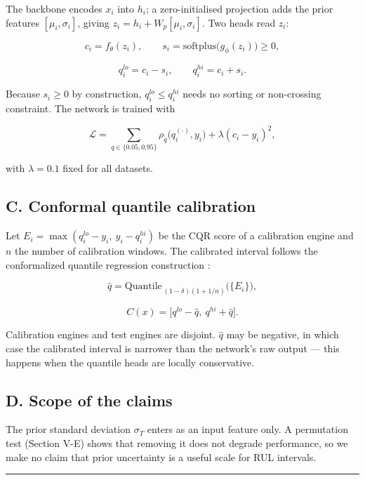 The backbone encodes \(x_i\) into \(h_i\); a zero-initialised projection adds the prior features \([\mu_i, \sigma_i]\), giving \(z_i = h_i + W_p[\mu_i, \sigma_i]\). Two heads read \(z_i\):

\[c_i = f_\theta(z_i), \qquad s_i = \mathrm{softplus}\big(g_\phi(z_i)\big) \ge 0,\]

\[q^{lo}_i = c_i - s_i, \qquad q^{hi}_i = c_i + s_i .\]

Because \(s_i \ge 0\) by construction, \(q^{lo}_i \le q^{hi}_i\) needs no sorting or non-crossing constraint. The network is trained with

\[\mathcal{L} = \sum_{q\in\{0.05,0.95\}} \rho_q\big(q^{(\cdot)}_i, y_i\big) + \lambda (c_i - y_i)^2 ,\]

with \(\lambda = 0.1\) fixed for all datasets.

\subsection{C. Conformal quantile calibration}\label{c.-conformal-quantile-calibration}

Let \(E_i = \max(q^{lo}_i - y_i,\ y_i - q^{hi}_i)\) be the CQR score of a calibration engine and \(n\) the number of calibration windows. The calibrated interval follows the conformalized quantile regression construction \citep{romano2019}:

\[\hat{q} = \mathrm{Quantile}_{\,(1-\delta)(1+1/n)}\big(\{E_i\}\big),\]

\[C(x) = \big[q^{lo} - \hat{q},\ q^{hi} + \hat{q}\big].\]

Calibration engines and test engines are disjoint. \(\hat{q}\) may be negative, in which case the calibrated interval is narrower than the network's raw output --- this happens when the quantile heads are locally conservative.

\subsection{D. Scope of the claims}\label{d.-scope-of-the-claims}

The prior standard deviation \(\sigma_T\) enters as an input feature only. A permutation test (Section V-E) shows that removing it does not degrade performance, so we make no claim that prior uncertainty is a useful scale for RUL intervals.

\begin{center}\rule{0.5\linewidth}{0.5pt}\end{center}

